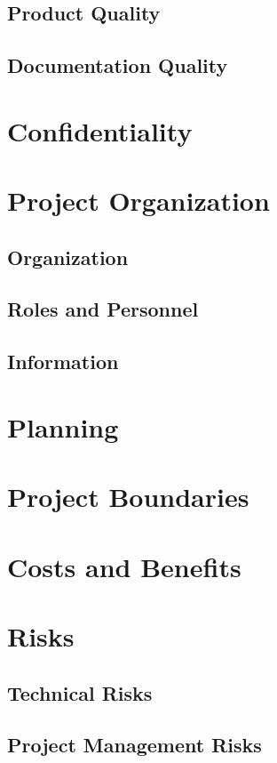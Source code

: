 \documentclass{article}
\begin{document}
\subsection{Product Quality}
\subsection{Documentation Quality}


\newpage
\section{Confidentiality}


\newpage
\section{Project Organization}
\subsection{Organization}
\subsection{Roles and Personnel}
\subsection{Information}


\newpage
\section{Planning}


\newpage
\section{Project Boundaries}


\newpage
\section{Costs and Benefits}


\newpage
\section{Risks}
\subsection{Technical Risks}
\subsection{Project Management Risks}
\end{document}
